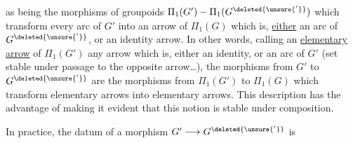 as being the morphisms of groupoids $\Pi_1(G')-\Pi_1(G^{\deleted{\unsure{'}}})$ which transform every arc of $G'$ into an arrow of $\Pi_1(G)$ which is, \uline{either} an arc of $G^{\deleted{\unsure{'}}}$, or an identity arrow. In other words, calling an \uline{elementary arrow} of $\Pi_1(G')$ any arrow which is, either an identity, or an arc of $G'$ (set  stable under passage to the opposite arrow\ldots), the  morphisms   from $G'$ to $G^{\deleted{\unsure{'}}}$ are the morphisms from $\Pi_1(G')$ to $\Pi_1(G)$ which transform elementary arrows into elementary arrows. This description has the advantage of making it evident that this notion is stable under composition.

In practice, the datum of a  morphism    $G'\longrightarrow G^{\deleted{\unsure{'}}}$ is 
